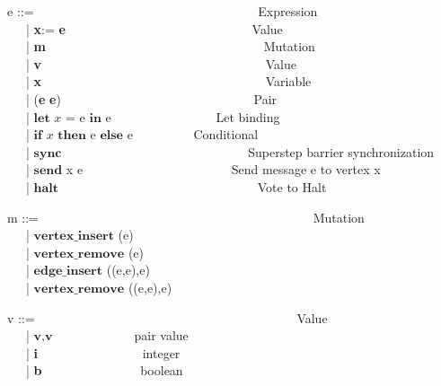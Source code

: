 \begin{frame}
  e ::= \ \ \ \ \ \ \ \ \ \ \ \ \ \ \ \ \ \ \ \ \ \ \ \ \ \ \ \ \ \ \ \ \ \ \ Expression \\
  \ \ \ | \textbf{x}:= \textbf{e}   \ \ \ \ \ \ \ \ \ \ \ \  \ \ \ \ \ \ \ \ \ \ \ \ \ \ \ \ \ Value \\
  \ \ \ | \textbf{m}  \ \ \ \ \ \ \ \ \ \ \ \  \ \ \ \ \ \ \ \ \ \ \ \ \ \ \ \ \ \ \ \ \ \ Mutation \\
  \ \ \ | \textbf{v}  \ \ \ \ \ \ \ \ \ \ \ \  \ \ \ \ \ \ \ \ \ \ \ \ \ \ \ \ \ \ \ \ \ \ \ Value \\
  \ \ \ | \textbf{x} \ \ \ \ \ \ \ \ \ \ \  \ \ \ \ \ \ \ \ \ \ \ \ \ \ \ \ \ \ \ \ \ \ \ \ Variable \\
  \ \ \ | (\textbf{e} \textbf{e})   \ \ \ \ \ \ \ \ \ \ \  \ \ \ \ \ \ \ \ \ \ \ \ \ \ \ \ \ \ \ Pair \\
  \ \ \ |  $\textbf{let}$ $x$ $\textbf{=}$ e $\textbf{in}$ e  \ \ \ \ \ \ \ \ \ \ \ \ \ \ \ \ Let binding \\
  \ \ \ |  $\textbf{if}$ $x$ $\textbf{then}$ e $\textbf{else}$ e \ \ \ \ \ \ \ \ \ Conditional \\
  \ \ \ |  $\textbf{sync}$ \ \ \ \ \ \ \ \  \ \ \ \ \ \ \  \ \ \ \ \ \ \ \  \ \ \ \ \ \  Superstep barrier synchronization\\
  \ \ \ |  $\textbf{send}$ x e \ \ \ \ \ \ \ \ \ \ \ \ \ \ \ \ \ \ \ \ \ \ \ Send message e to vertex x \\
  \ \ \ |  $\textbf{halt}$ \ \ \ \  \ \ \ \ \ \ \ \  \ \ \ \ \ \ \ \ \ \ \ \ \ \ \ \ \ \ \ Vote to Halt \\
\end{frame}

\begin{frame}
  m ::= \ \ \ \ \ \ \ \ \ \ \ \ \ \ \ \ \ \ \ \ \ \ \ \ \ \ \ \ \ \ \ \ \ \ \ \ \ \ \ \ \ \ \ Mutation \\
  \ \ \ | $\textbf{vertex\_insert}$ (e) \\
  \ \ \ | $\textbf{vertex\_remove}$ (e) \\
  \ \ \ | $\textbf{edge\_insert}$ ((e,e),e) \\
  \ \ \ | $\textbf{vertex\_remove}$ ((e,e),e) \\
\end{frame}

\begin{frame}
  v ::= \ \ \ \ \ \ \ \ \ \ \ \ \ \ \ \ \ \ \ \ \ \ \ \ \ \ \ \ \ \ \ \ \ \ \ \ \ \ \ \ \ Value \\
    \ \ \ | $\textbf{v},\textbf{v}$ \ \ \ \ \ \ \ \ \ \ \ \ pair value \\
    \ \ \ | \textbf{i} \ \ \ \ \ \ \ \ \ \ \ \ \ \ \ \  integer \\
    \ \ \ | \textbf{b} \ \ \ \ \ \ \ \ \ \ \ \ \ \ \ boolean \\
\end{frame}

